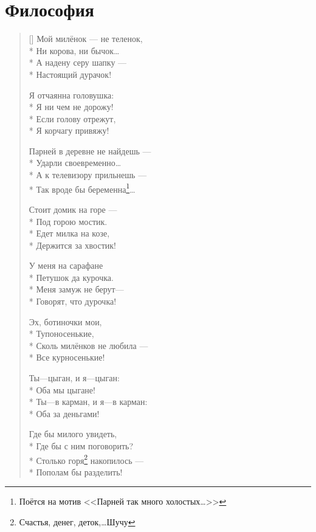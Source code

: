 \documentclass[a4paper,oneside,14pt]{scrbook}
\begin{document}
    \section{Философия}
    \settowidth{\versewidth}{Парней в деревне не найдешь ---}
    \begin{verse}[\versewidth]
        Мой милёнок --- не теленок,\\*
        Ни корова, ни бычок\ldots\\*
        А надену серу шапку --- \\*
        Настоящий дурачок!
        
        Я отчаянна головушка:\\*
        Я ни чем не дорожу!\\*
        Если голову отрежут,\\*
        Я корчагу привяжу!
        
        Парней в деревне не найдешь ---\\*
        Ударли своевременно\ldots\\*
        А к телевизору прильнешь ---\\*
        Так вроде бы беременна\footnote{Поётся на мотив <<Парней так много холостых\ldots>>}\ldots
        
        Стоит домик на горе ---\\*
        Под горою мостик.\\*
        Едет милка на козе,\\*
        Держится за хвостик!
        
        У меня на сарафане\\*
        Петушок да курочка.\\*
        Меня замуж не берут---\\*
        Говорят, что дурочка!
        
        Эх, ботиночки мои,\\*
        Тупоносенькие,\\*
        Сколь милёнков не любила ---\\*
        Все курносенькие!
        
        Ты---цыган, и я---цыган:\\*
        Оба мы цыгане!\\*
        Ты---в карман, и я---в карман:\\*
        Оба за деньгами!

        Где бы милого увидеть,\\*
        Где бы с ним поговорить?\\*
        Столько горя\footnote{Счастья, денег, деток,\ldots Шучу} накопилось ---\\*
        Пополам бы разделить!
        

\end{verse}
\end{document}
